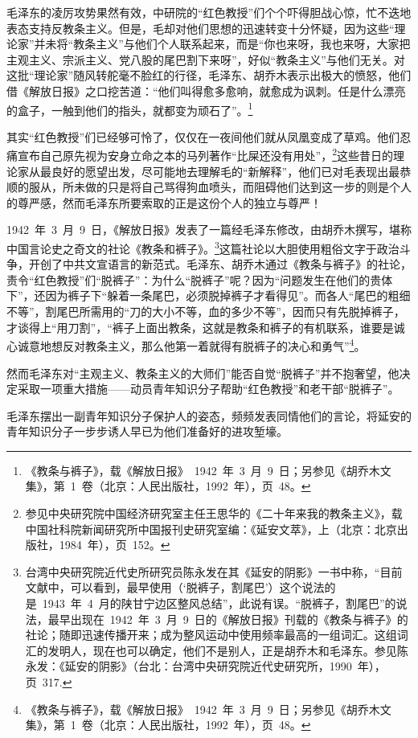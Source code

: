 毛泽东的凌厉攻势果然有效，中研院的“红色教授”们个个吓得胆战心惊，忙不迭地表态支持反教条主义。但是，毛却对他们思想的迅速转变十分怀疑，因为这些“理论家”并未将“教条主义”与他们个人联系起来，而是“你也来呀，我也来呀，大家把主观主义、宗派主义、党八股的尾巴割下来呀”，好似“教条主义”与他们无关。对这批“理论家”随风转舵毫不脸红的行径，毛泽东、胡乔木表示出极大的愤怒，他们借《解放日报》之口挖苦道：“他们叫得愈多愈响，就愈成为讽刺。任是什么漂亮的盒子，一触到他们的指头，就都变为顽石了”。\footnote{《教条与裤子》，载《解放日报》~1942~年~3~月~9~日；另参见《胡乔木文集》，第~1~卷（北京：人民出版社，1992~年），页~48。}

其实“红色教授”们已经够可怜了，仅仅在一夜间他们就从凤凰变成了草鸡。他们忍痛宣布自己原先视为安身立命之本的马列著作“比屎还没有用处”，\footnote{参见中央研究院中国经济研究室主任王思华的《二十年来我的教条主义》，载中国社科院新闻研究所中国报刊史研究室编：《延安文萃》，上（北京：北京出版社，1984~年），页~152。}这些昔日的理论家从最良好的愿望出发，尽可能地去理解毛的“新解释”，他们已对毛表现出最恭顺的服从，所未做的只是将自己骂得狗血喷头，而阻碍他们达到这一步的则是个人的尊严感，然而毛泽东所要索取的正是这份个人的独立与尊严！


1942~年~3~月~9~日，《解放日报》发表了一篇经毛泽东修改，由胡乔木撰写，堪称中国言论史之奇文的社论《教条和裤子》。\footnote{台湾中央研究院近代史所研究员陈永发在其《延安的阴影》一书中称，“目前文献中，可以看到，最早使用（‘脱裤子，割尾巴’）这个说法的是~1943~年~4~月的陕甘宁边区整风总结”，此说有误。“脱裤子，割尾巴”的说法，最早出现在~1942~年~3~月~9~日的《解放日报》刊载的《教条与裤子》的社论；随即迅速传播开来；成为整风运动中使用频率最高的一组词汇。这组词汇的发明人，现在也可以确定，他们不是别人，正是胡乔木和毛泽东。参见陈永发：《延安的阴影》（台北：台湾中央研究院近代史研究所，1990~年），页~317.}这篇社论以大胆使用粗俗文字于政治斗争，开创了中共文宣语言的新范式。毛泽东、胡乔木通过《教条与裤子》的社论，责令“红色教授”们“脱裤子”：为什么“脱裤子”呢？因为“问题发生在他们的贵体下”，还因为裤子下“躲着一条尾巴，必须脱掉裤子才看得见”。而各人“尾巴的粗细不等”，割尾巴所需用的“刀的大小不等，血的多少不等”，因而只有先脱掉裤子，才谈得上“用刀割”，“裤子上面出教条，这就是教条和裤子的有机联系，谁要是诚心诚意地想反对教条主义，那么他第一着就得有脱裤子的决心和勇气”\footnote{《教条与裤子》，载《解放日报》~1942~年~3~月~9~日；另参见《胡乔木文集》，第~1~卷（北京：人民出版社，1992~年），页~48。}。

然而毛泽东对“主观主义、教条主义的大师们”能否自觉“脱裤子”并不抱奢望，他决定采取一项重大措施——动员青年知识分子帮助“红色教授”和老干部“脱裤子”。

毛泽东摆出一副青年知识分子保护人的姿态，频频发表同情他们的言论，将延安的青年知识分子一步步诱人早已为他们准备好的进攻堑壕。

